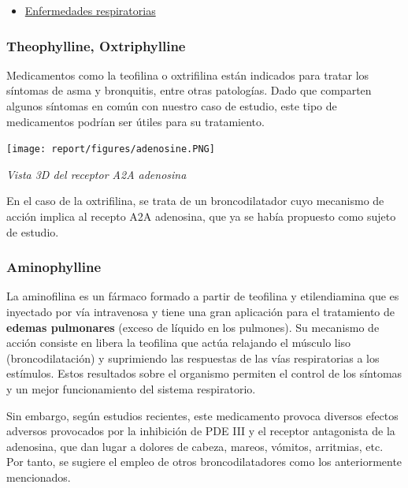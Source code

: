 \begin{itemize}
    \item \underline{Enfermedades respiratorias}
\end{itemize}


\subsubsection{Theophylline, Oxtriphylline}

Medicamentos como la teofilina o oxtrifilina están indicados para tratar los síntomas de asma y bronquitis, entre otras patologías.
Dado que comparten algunos síntomas en común con nuestro caso de estudio, este tipo de medicamentos podrían ser útiles para su tratamiento.

\begin{center}

\texttt{[image: report/figures/adenosine.PNG]}


\caption{\textit{Vista 3D del receptor A2A adenosina}}

\end{center}

En el caso de la oxtrifilina, se trata de un broncodilatador cuyo mecanismo de acción implica al recepto A2A adenosina, que ya se había propuesto como sujeto de estudio.
\cite{Abouelkhair2020TargetingHypothesis}

\subsubsection{Aminophylline}

La aminofilina es un fármaco formado a partir de teofilina y etilendiamina que es inyectado por vía intravenosa y tiene una gran aplicación para el tratamiento de \textbf{edemas pulmonares} (exceso de líquido en los pulmones). Su mecanismo de acción consiste en libera la teofilina que actúa relajando el músculo liso (broncodilatación) y suprimiendo las respuestas de las vías respiratorias a los estímulos. Estos resultados sobre el organismo permiten el control de los síntomas y un mejor funcionamiento del sistema respiratorio.

Sin embargo, según estudios recientes, este medicamento provoca diversos efectos adversos provocados por la inhibición de PDE III y  el receptor antagonista de la adenosina, que dan lugar a dolores de cabeza, mareos, vómitos, arritmias, etc. Por tanto, se sugiere el empleo de otros broncodilatadores como los anteriormente mencionados.\newline


